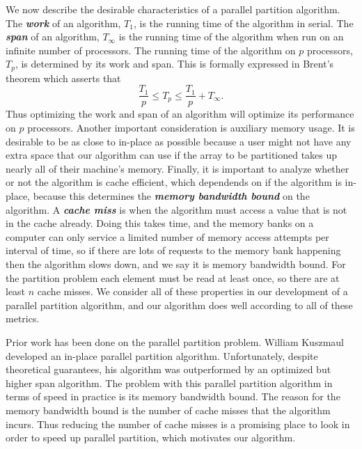 \documentclass[twocolumn, twoside, 11pt]{article}
\newcommand{\defn}[1]       {{\textit{\textbf{\boldmath #1}}}}
\renewcommand{\paragraph}[1]{\vspace{0.09in}\noindent{\bf \boldmath #1.}}
\begin{document}
\paragraph{Factors to Consider}
We now describe the desirable characteristics of a parallel partition algorithm.
The \defn{work} of an algorithm, $T_1$, is the running time of the algorithm in serial. 
The \defn{span} of an algorithm, $T_\infty$ is the running time of the algorithm when run on an infinite number of processors.
The running time of the algorithm on $p$ processors, $T_p$, is determined by its work and span.
This is formally expressed in Brent's theorem which asserts that
$$\frac{T_1}{p} \le T_p \le \frac{T_1}{p} + T_\infty.$$ 
Thus optimizing the work and span of an algorithm will optimize its performance on $p$ processors.
Another important consideration is auxiliary memory usage. 
It is desirable to be as close to in-place as possible because a user might not have any extra space that our algorithm can use if the array to be partitioned takes up nearly all of their machine's memory.
Finally, it is important to analyze whether or not the algorithm is cache efficient, which dependends on if the algorithm is in-place, because this determines the \defn{memory bandwidth bound} on the algorithm.
A \defn{cache miss} is when the algorithm must access a value that is not in the cache already.
Doing this takes time, and the memory banks on a computer can only service a limited number of memory access attempts per interval of time, so if there are lots of requests to the memory bank happening then the algorithm slows down, and we say it is memory bandwidth bound.
For the partition problem each element must be read at least once, so there are at least $n$ cache misses.
We consider all of these properties in our development of a parallel partition algorithm, and our algorithm does well according to all of these metrics.

\paragraph{Prior Work}
Prior work has been done on the parallel partition problem.
William Kuszmaul developed an in-place parallel partition algorithm.
Unfortunately, despite theoretical guarantees, his algorithm was outperformed by an optimized but higher span algorithm.
The problem with this parallel partition algorithm in terms of speed in practice is its memory bandwidth bound.
The reason for the memory bandwidth bound is the number of cache misses that the algorithm incurs.
Thus reducing the number of cache misses is a promising place to look in order to speed up parallel partition, which motivates our algorithm.
\end{document}
